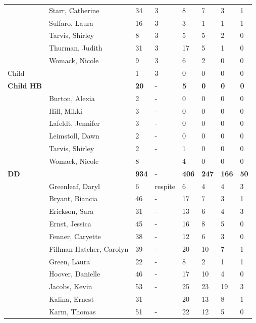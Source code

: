 \documentclass{article}\usepackage[]{graphicx}\usepackage[]{color}
\begin{document}
{\begin{longtable} { >{\raggedright}p{}p{}p{}p{}p{}p{}p{}p{}}
   & Starr, Catherine & 34 & 3 & 8 & 7 & 3 & 1 \\ 
   & Sulfaro, Laura & 16 & 3 & 3 & 1 & 1 & 1 \\ 
   & Tarvis, Shirley & 8 & 3 & 5 & 5 & 2 & 0 \\ 
   \rowcolor[gray]{0.90} & Thurman, Judith & 31 & 3 & 17 & 5 & 1 & 0 \\ 
   \rowcolor[gray]{0.90} & Womack, Nicole & 9 & 3 & 6 & 2 & 0 & 0 \\ 
   \hline
Child &  & 1 & 3 & 0 & 0 & 0 & 0 \\ 
   \hline
\textbf{Child HB} &  & \textbf{20} & - & \textbf{5} & \textbf{0} & \textbf{0} & \textbf{0} \\ 
   & Burton, Alexia & 2 & - & 0 & 0 & 0 & 0 \\ 
   & Hill, Mikki & 3 & - & 0 & 0 & 0 & 0 \\ 
   \rowcolor[gray]{0.90} & Lafeldt, Jennifer & 3 & - & 0 & 0 & 0 & 0 \\ 
   \rowcolor[gray]{0.90} & Leimstoll, Dawn & 2 & - & 0 & 0 & 0 & 0 \\ 
   \rowcolor[gray]{0.90} & Tarvis, Shirley & 2 & - & 1 & 0 & 0 & 0 \\ 
   & Womack, Nicole & 8 & - & 4 & 0 & 0 & 0 \\ 
   \hline
\textbf{DD} &  & \textbf{934} & - & \textbf{406} & \textbf{247} & \textbf{166} & \textbf{50} \\ 
   & Greenleaf, Daryl & 6 & respite & 6 & 4 & 4 & 3 \\ 
   \rowcolor[gray]{0.90} & Bryant, Biancia & 46 & - & 17 & 7 & 3 & 1 \\ 
   \rowcolor[gray]{0.90} & Erickson, Sara & 31 & - & 13 & 6 & 4 & 3 \\ 
   \rowcolor[gray]{0.90} & Ernst, Jessica & 45 & - & 16 & 8 & 5 & 0 \\ 
   & Fenner, Caryette & 38 & - & 12 & 6 & 3 & 0 \\ 
   & Fillman-Hatcher, Carolyn & 39 & - & 20 & 10 & 7 & 1 \\ 
   & Green, Laura & 22 & - & 8 & 2 & 1 & 1 \\ 
   \rowcolor[gray]{0.90} & Hoover, Danielle & 46 & - & 17 & 10 & 4 & 0 \\ 
   \rowcolor[gray]{0.90} & Jacobs, Kevin & 53 & - & 25 & 23 & 19 & 3 \\ 
   \rowcolor[gray]{0.90} & Kalina, Ernest & 31 & - & 20 & 13 & 8 & 1 \\ 
   & Karm, Thomas & 51 & - & 22 & 12 & 5 & 0 \\ 

\end{longtable}}
\end{document}

